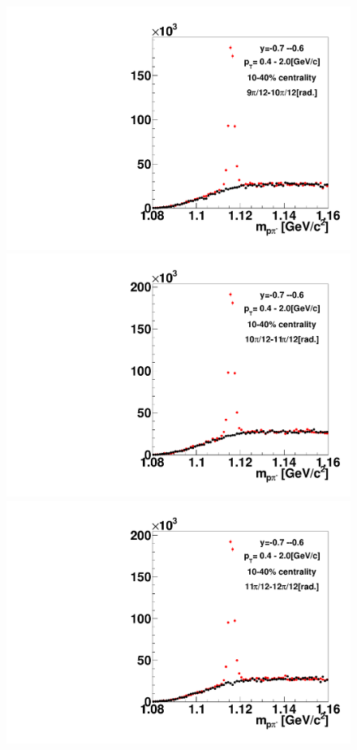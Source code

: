 \begin{figure}[h]
\includegraphics[width=0.14\linewidth]{chapterX/fig/ld_v1_sig/kf_ptslice0_cent1_ld_flow_phi10_rap11_check.pdf}
\includegraphics[width=0.14\linewidth]{chapterX/fig/ld_v1_sig/kf_ptslice0_cent1_ld_flow_phi11_rap11_check.pdf}
\includegraphics[width=0.14\linewidth]{chapterX/fig/ld_v1_sig/kf_ptslice0_cent1_ld_flow_phi12_rap11_check.pdf}


\end{figure}

